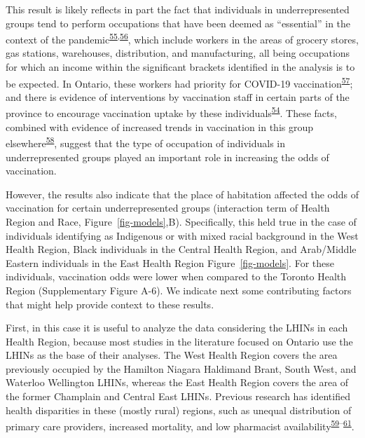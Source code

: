 \documentclass[
]{article}
\begin{document}
This result is likely reflects in part the fact that individuals in
underrepresented groups tend to perform occupations that have been
deemed as ``essential'' in the context of the
pandemic\textsuperscript{\protect\hyperlink{ref-hawkins2020}{55},\protect\hyperlink{ref-ct2021}{56}},
which include workers in the areas of grocery stores, gas stations,
warehouses, distribution, and manufacturing, all being occupations for
which an income within the significant brackets identified in the
analysis is to be expected. In Ontario, these workers had priority for
COVID-19
vaccination\textsuperscript{\protect\hyperlink{ref-mishra2021}{57}}; and
there is evidence of interventions by vaccination staff in certain parts
of the province to encourage vaccination uptake by these
individuals\textsuperscript{\protect\hyperlink{ref-gill2022}{54}}. These
facts, combined with evidence of increased trends in vaccination in this
group
elsewhere\textsuperscript{\protect\hyperlink{ref-nguyen2021b}{58}},
suggest that the type of occupation of individuals in underrepresented
groups played an important role in increasing the odds of vaccination.

However, the results also indicate that the place of habitation affected
the odds of vaccination for certain underrepresented groups (interaction
term of Health Region and Race, Figure~\ref{fig-models},B).
Specifically, this held true in the case of individuals identifying as
Indigenous or with mixed racial background in the West Health Region,
Black individuals in the Central Health Region, and Arab/Middle Eastern
individuals in the East Health Region Figure~\ref{fig-models}. For these
individuals, vaccination odds were lower when compared to the Toronto
Health Region (Supplementary Figure A-6). We indicate next some
contributing factors that might help provide context to these results.

First, in this case it is useful to analyze the data considering the
LHINs in each Health Region, because most studies in the literature
focused on Ontario use the LHINs as the base of their analyses. The West
Health Region covers the area previously occupied by the Hamilton
Niagara Haldimand Brant, South West, and Waterloo Wellington LHINs,
whereas the East Health Region covers the area of the former Champlain
and Central East LHINs. Previous research has identified health
disparities in these (mostly rural) regions, such as unequal
distribution of primary care providers, increased mortality, and low
pharmacist
availability\textsuperscript{\protect\hyperlink{ref-shah2019}{59}--\protect\hyperlink{ref-timony2022}{61}}.
\end{document}
